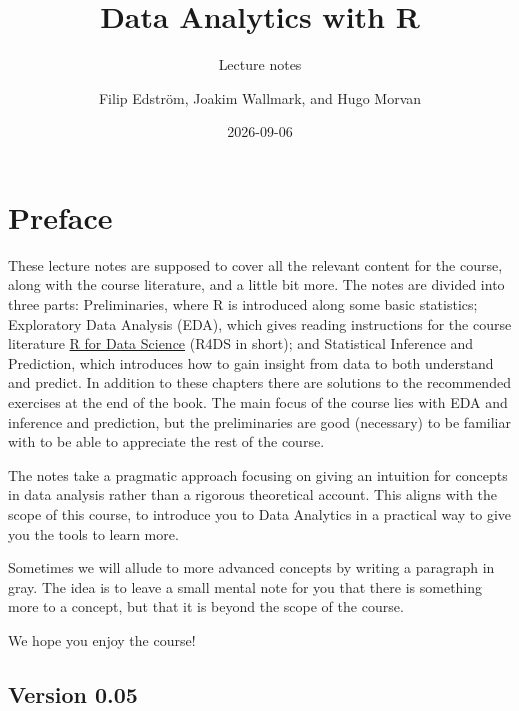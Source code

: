 \documentclass[
  letterpaper,
  DIV=11,
  numbers=noendperiod]{scrreprt}
\title{Data Analytics with R}
\subtitle{Lecture notes}
\author{Filip Edström, Joakim Wallmark, and Hugo Morvan}
\date{2026-09-06}
\renewcommand*\contentsname{Table of contents}
\newcommand\contentsname{Table of contents}
\begin{document}
\maketitle

\renewcommand*\contentsname{Table of contents}
{
\hypersetup{linkcolor=}
\setcounter{tocdepth}{2}
\tableofcontents
}

\chapter*{Preface}\label{preface}


These lecture notes are supposed to cover all the relevant content for
the course, along with the course literature, and a little bit more. The
notes are divided into three parts: Preliminaries, where R is introduced
along some basic statistics; Exploratory Data Analysis (EDA), which
gives reading instructions for the course literature
\href{https://r4ds.hadley.nz/}{R for Data Science} (R4DS in short); and
Statistical Inference and Prediction, which introduces how to gain
insight from data to both understand and predict. In addition to these
chapters there are solutions to the recommended exercises at the end of
the book. The main focus of the course lies with EDA and inference and
prediction, but the preliminaries are good (necessary) to be familiar
with to be able to appreciate the rest of the course.

The notes take a pragmatic approach focusing on giving an intuition for
concepts in data analysis rather than a rigorous theoretical account.
This aligns with the scope of this course, to introduce you to Data
Analytics in a practical way to give you the tools to learn more.

{Sometimes we will allude to more advanced concepts by writing a
paragraph in gray. The idea is to leave a small mental note for you that
there is something more to a concept, but that it is beyond the scope of
the course.}

We hope you enjoy the course!

\section*{Version 0.05}\label{version-0.05}

\end{document}
